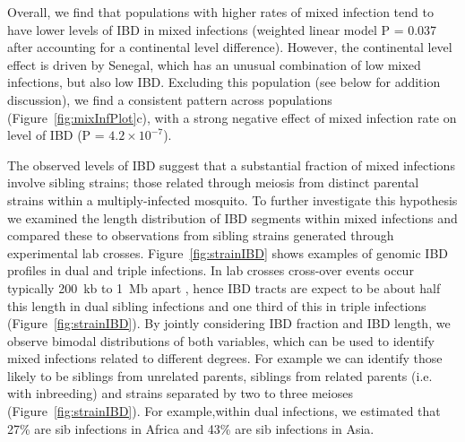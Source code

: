 \documentclass[9pt,lineno]{elife}
\begin{document}
Overall, we find that populations with higher rates of mixed infection tend to have lower levels of IBD in mixed infections (weighted linear model P = 0.037 after accounting for a continental level difference).  However, the continental level effect is driven by Senegal, which has an unusual combination of low mixed infections, but also low IBD.  Excluding this population (see below for addition discussion), we find a consistent pattern across populations (Figure~\ref{fig:mixInfPlot}c), with a strong negative effect of mixed infection rate on level of IBD (P = $4.2\times10^{-7}$).  

The observed levels of IBD suggest that a substantial fraction of mixed infections involve sibling strains; those related through meiosis from distinct parental strains within a multiply-infected mosquito.  To further investigate this hypothesis we examined the length distribution of IBD segments within mixed infections and compared these to observations from sibling strains generated through experimental lab crosses.  Figure~\ref{fig:strainIBD} shows examples of genomic IBD profiles in dual and triple infections.  In lab crosses cross-over events occur typically 200~kb to 1~Mb apart \citet{Miles2016}, hence IBD tracts are expect to be about half this length in dual sibling infections and one third of this in triple infections (Figure~\ref{fig:strainIBD}).  By jointly considering IBD fraction and IBD length, we observe bimodal distributions of both variables, which can be used to identify mixed infections related to different degrees.  For example we can identify those likely to be siblings from unrelated parents, siblings from related parents (i.e. with inbreeding) and strains separated by two to three meioses (Figure~\ref{fig:strainIBD}).  For example,within dual infections, we estimated that 27\% are sib infections in Africa and 43\% are sib infections in Asia. 
\end{document}
